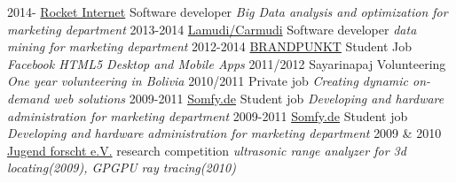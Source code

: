 \documentclass[]{friggeri-cv}
\begin{document}
\begin{entrylist}
  \entry
    {2014-}
    {\href{http://www.rocket-internet.com/}{Rocket Internet}}
    {Software developer}
    {\emph{Big Data analysis and optimization for marketing department}}
  \entry
    {2013-2014}
    {\href{http://www.lamudi.com/}{Lamudi/Carmudi}}
    {Software developer}
    {\emph{data mining for marketing department}}
  \entry
    {2012-2014}
    {\href{http://brandpunkt.com}{BRANDPUNKT}}
    {Student Job}
    {\emph{Facebook HTML5 Desktop and Mobile Apps}}
  \entry
    {2011/2012}
    {Sayarinapaj}
    {Volunteering}
    {\emph{One year volunteering in Bolivia}}
  \entry
    {2010/2011}
    {}
    {Private job}
    {\emph{Creating dynamic on-demand web solutions}}
  \entry
    {2009-2011}
    {\href{http://www.somfy.de}{Somfy.de}}
    {Student job}
    {\emph{Developing and hardware administration for marketing department }}
  \entry
    {2009-2011}
    {\href{http://www.somfy.de}{Somfy.de}}
    {Student job}
    {\emph{Developing and hardware administration for marketing department }}
  \entry
    {2009 \& 2010}
    {\href{http://jugend-forscht.de}{Jugend forscht e.V.}}
    {research competition}
    {\emph{ultrasonic range analyzer for 3d locating(2009), GPGPU ray tracing(2010)}}
\end{entrylist}

%

%
%
\end{document}
